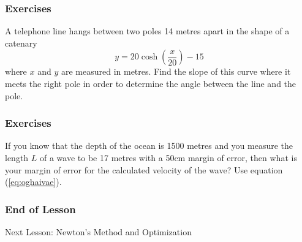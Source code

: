\documentclass[xcolor=dvipsnames]{beamer}
\begin{document}
\begin{frame}
  \frametitle{Exercises}
{\ubung} A telephone line hangs between two poles 14 metres apart in
the shape of a catenary
\begin{equation}
  \label{eq:lufaebeg}
  y=20\cosh\left(\frac{x}{20}\right)-15
\end{equation}
where $x$ and $y$ are measured in metres. Find the slope of this curve
where it meets the right pole in order to determine the angle between
the line and the pole.
\end{frame}

\begin{frame}
  \frametitle{Exercises}
{\ubung} If you know that the depth of the ocean is 1500 metres and
you measure the length $L$ of a wave to be 17 metres with a 50cm
margin of error, then what is your margin of error for the calculated
velocity of the wave? Use equation (\ref{eq:oghaivae}).
\end{frame}

\begin{frame}
  \frametitle{End of Lesson}
Next Lesson: Newton's Method and Optimization
\end{frame}
\end{document}
